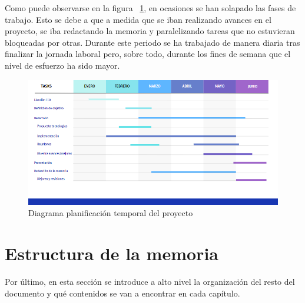 \documentclass[a4paper, 12pt]{book}
\begin{document}
Como puede observarse en la figura ~\ref{figura:GANTT_TFG}, en ocasiones se han solapado las fases de trabajo. Esto se debe a que a medida que se iban realizando avances en el proyecto, se iba redactando la memoria y paralelizando tareas que no estuvieran bloqueadas por otras.
Durante este periodo se ha trabajado de manera diaria tras finalizar la jornada laboral pero, sobre todo, durante los fines de semana que el nivel de esfuerzo ha sido mayor. 
    \begin{figure}
        \centering
        \includegraphics[width=\textwidth]{img/GANTT_TFG.png}
        \caption{Diagrama planificación temporal del proyecto}
        \label{figura:GANTT_TFG}
    \end{figure}
    


\section{Estructura de la memoria}
\label{sec:estructura}

Por último, en esta sección se introduce a alto nivel la organización del resto del documento
y qué contenidos se van a encontrar en cada capítulo.
\end{document}

